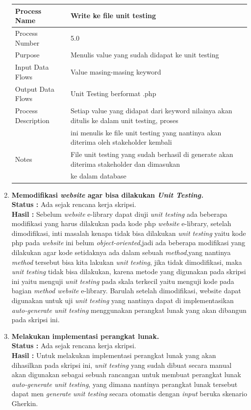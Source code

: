 \documentclass[a4paper,twoside]{article}
\begin{document}
\begin{enumerate}
\begin{center}
\begin{tabular}{ |l|l| } 
 \hline
 Process Name & Write ke file unit testing \\ 
 \hline
 Process Number & 5.0  \\ 
 \hline
 Purpose & Menulis value yang sudah didapat ke unit testing \\ 
 \hline
 Input Data Flows & Value masing-masing keyword \\
 \hline
 Output Data Flows & Unit Testing berformat .php \\
 \hline
 Process Description & Setiap value yang didapat dari keyword nilainya akan ditulis ke dalam unit testing, proses \\
 & ini menulis ke file unit testing yang nantinya akan diterima oleh stakeholder kembali\\
 \hline
 Notes & File unit testing yang sudah berhasil di generate akan diterima stakeholder dan dimasukan \\
 & ke dalam database\\
 \hline
\end{tabular}
\end{center}
		
\item \textbf{Memodifikasi \textit{website} agar bisa dilakukan \textit{Unit Testing.}}\\
\textbf{Status :} Ada sejak rencana kerja skripsi.\\
\textbf{Hasil :} Sebelum \textit{website} e-library dapat diuji \textit{unit testing} ada beberapa modifikasi yang harus dilakukan pada kode php \textit{website} e-library, setelah dimodifikasi, inti masalah kenapa tidak bisa dilakukan \textit{unit testing} yaitu kode php pada \textit{website} ini belum \textit{object-oriented},jadi ada beberapa modifikasi yang dilakukan agar kode setidaknya ada dalam sebuah \textit{method},yang nantinya \textit{method} tersebut bisa kita lakukan \textit{unit testing}, jika tidak dimodifikasi, maka \textit{unit testing} tidak bisa dilakukan, karena metode yang digunakan pada skripsi ini yaitu menguji \textit{unit testing} pada skala terkecil yaitu menguji kode pada bagian \textit{method website} e-library. Barulah setelah dimodifikasi, website dapat digunakan untuk uji \textit{unit testing} yang nantinya dapat di implementasikan \textit{auto-generate unit testing} menggunakan perangkat lunak yang akan dibangun pada skripsi ini.

\item \textbf{Melakukan implementasi perangkat lunak.}\\
\textbf{Status :} Ada sejak rencana kerja skripsi.\\
\textbf{Hasil :} Untuk melakukan implementasi perangkat lunak yang akan dihasilkan pada skripsi ini, \textit{unit testing} yang sudah dibuat secara manual akan digunakan sebagai sebuah rancangan untuk membuat perangkat lunak \textit{auto-generate unit testing}, yang dimana nantinya perangkat lunak tersebut dapat men \textit{generate} \textit{unit testing} secara otomatis dengan \textit{input} beruka skenario Gherkin.


\end{enumerate}
\end{document}

